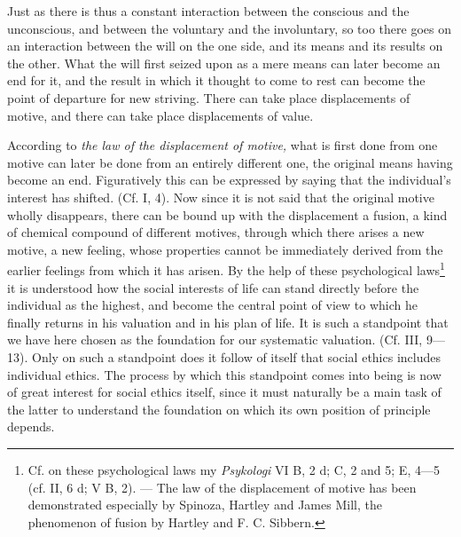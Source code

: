 \documentclass[12pt,a4paper,openany]{book}
\begin{document}
Just as there is thus a constant interaction between the conscious and the unconscious, and between the voluntary and
the involuntary, so too there goes on an interaction between the will on the one side, and its means and its results on
the other. What the will first seized upon as a mere means can later become an end for it, and the result in which it
thought to come to rest can become the point of departure for new striving. There can take place displacements of
motive, and there can take place displacements of value.

According to \textit{the law of the displacement of motive,} what is first done from one motive can later be done from
an entirely different one, the original means having become an end. Figuratively this can be expressed by saying that
the individual's interest has shifted. (Cf. I, 4). Now since it is not said that the original motive wholly
disappears, there can be bound up with the displacement a fusion, a kind of chemical compound of different motives,
through which there arises a new motive, a new feeling, whose properties cannot be immediately derived from the earlier
feelings from which it has arisen. By the help of these psychological laws\footnote[1]{Cf. on these psychological laws
my \textit{Psykologi} VI B, 2 d; C, 2 and 5; E, 4---5 (cf. II, 6 d; V B, 2). --- The law of the displacement of motive
has been demonstrated especially by Spinoza, Hartley and James Mill, the phenomenon of fusion by Hartley and F. C.
Sibbern.} it is understood how the social interests of life can stand directly before the individual as the highest,
and become the central point of view to which he finally returns in his valuation and in his plan of life. It is such a
standpoint that we have here chosen as the foundation for our systematic valuation. (Cf. III, 9---13). Only on such a
standpoint does it follow of itself that social ethics includes individual ethics. The process by which this standpoint
comes into being is now of great interest for social ethics itself, since it must naturally be a main task of the
latter to understand the foundation on which its own position of principle depends.
\end{document}
